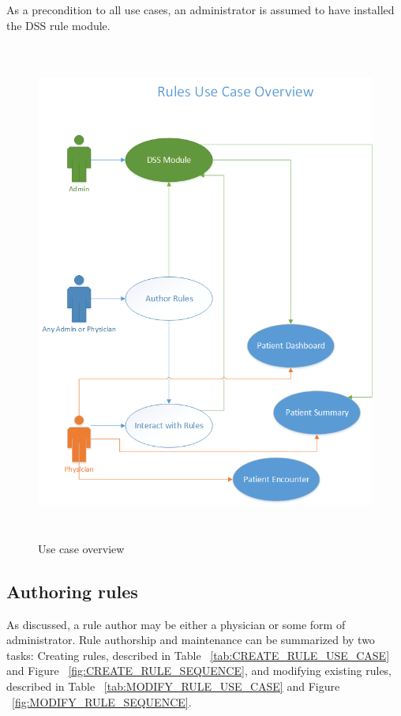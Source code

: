 \documentclass[12pt,letterpaper]{article}
\begin{document}
As a precondition to all use cases, an administrator is assumed to 
have installed the DSS rule module.

\begin{figure}\begin{center}
\includegraphics[height=6.5in]{use_case_overview.png}
\end{center}
\caption{Use case overview}
\label{fig:USE_CASE_OVERVIEW}
\end{figure}

\subsection{Authoring rules}

As discussed, a rule author may be either a physician or some 
form of administrator. Rule authorship and maintenance can be 
summarized by two tasks: Creating rules, described in 
Table ~\ref{tab:CREATE_RULE_USE_CASE} and 
Figure ~\ref{fig:CREATE_RULE_SEQUENCE},
and modifying existing rules, described in 
Table ~\ref{tab:MODIFY_RULE_USE_CASE} and 
Figure ~\ref{fig:MODIFY_RULE_SEQUENCE}.
\end{document}
